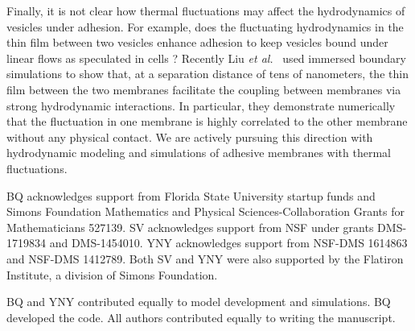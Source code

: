 \documentclass[prf,superscriptaddress,showkeys,longbibliography]{revtex4-1}
\begin{document}
Finally, it is not clear how thermal fluctuations may affect the
hydrodynamics of vesicles under adhesion. For example, does the
fluctuating hydrodynamics in the thin film between two vesicles enhance
adhesion to keep vesicles bound under linear flows as speculated in cells \cite{FenzBihrSchmidt2017_NaturePhys}?  Recently Liu {\em
et al.}~\cite{LiuChuNewbyRead2018_bioRxiv} used immersed boundary
simulations to show that, at a separation distance of tens of
nanometers, the thin film between the two membranes facilitate the
coupling between membranes via strong hydrodynamic interactions. In
particular, they demonstrate numerically that the fluctuation in one
membrane is highly correlated to the other membrane without any physical
contact. We are actively pursuing this direction with hydrodynamic
modeling and simulations of adhesive membranes with thermal fluctuations.

\acknowledgments

BQ acknowledges support from Florida State University startup funds and
Simons Foundation Mathematics and Physical Sciences-Collaboration Grants
for Mathematicians 527139.  SV acknowledges support from NSF under
grants DMS-1719834 and DMS-1454010.  YNY acknowledges support from
NSF-DMS 1614863 and NSF-DMS 1412789.  Both SV and YNY were also supported
by the Flatiron Institute, a division of Simons Foundation.

BQ and YNY contributed equally to model development and simulations. BQ
developed the code. All authors contributed equally to writing the
manuscript.
\end{document}
